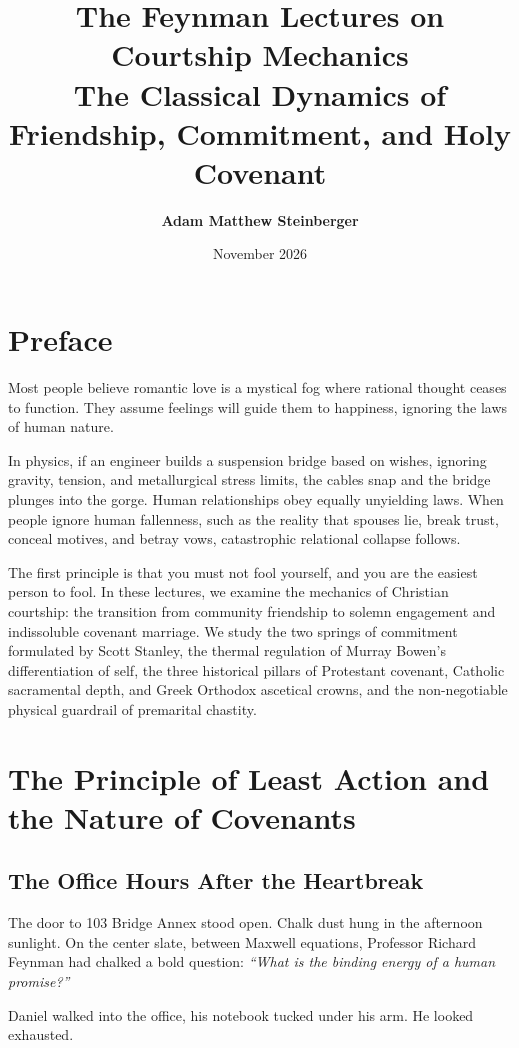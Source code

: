 \documentclass[11pt]{report}
\title{\Huge\textbf{The Feynman Lectures on Courtship Mechanics}\\
\Large The Classical Dynamics of Friendship, Commitment, and Holy Covenant}
\author{\textbf{Adam Matthew Steinberger}}
\date{November 2026}
\begin{document}
\maketitle

\tableofcontents
\newpage

\chapter*{Preface}

Most people believe romantic love is a mystical fog where rational thought ceases to function. They assume feelings will guide them to happiness, ignoring the laws of human nature.

In physics, if an engineer builds a suspension bridge based on wishes, ignoring gravity, tension, and metallurgical stress limits, the cables snap and the bridge plunges into the gorge. Human relationships obey equally unyielding laws. When people ignore human fallenness, such as the reality that spouses lie, break trust, conceal motives, and betray vows, catastrophic relational collapse follows.

The first principle is that you must not fool yourself, and you are the easiest person to fool. In these lectures, we examine the mechanics of Christian courtship: the transition from community friendship to solemn engagement and indissoluble covenant marriage. We study the two springs of commitment formulated by Scott Stanley, the thermal regulation of Murray Bowen's differentiation of self, the three historical pillars of Protestant covenant, Catholic sacramental depth, and Greek Orthodox ascetical crowns, and the non-negotiable physical guardrail of premarital chastity.

\chapter{The Principle of Least Action and the Nature of Covenants}

\section{The Office Hours After the Heartbreak}
The door to 103 Bridge Annex stood open. Chalk dust hung in the afternoon sunlight. On the center slate, between Maxwell equations, Professor Richard Feynman had chalked a bold question: \textit{``What is the binding energy of a human promise?''}

Daniel walked into the office, his notebook tucked under his arm. He looked exhausted.
\end{document}
